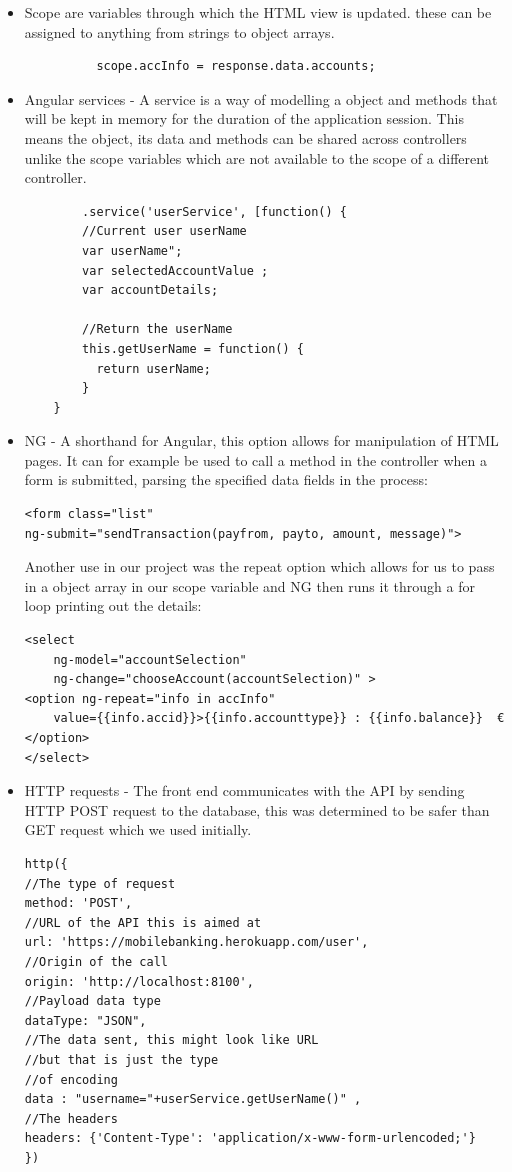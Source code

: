     \begin{itemize}
        \item Scope are variables through which the HTML view is updated. these can be assigned to anything from strings to object arrays.
\begin{verbatim}
          scope.accInfo = response.data.accounts;
\end{verbatim}

        \item Angular services - A service is a way of modelling a object and methods that will be kept in memory for the duration of the application session. This means the object, its data and methods can be shared across controllers unlike the scope variables which are not available to the scope of a different controller.

\begin{verbatim}
        .service('userService', [function() {
        //Current user userName
        var userName";
        var selectedAccountValue ;
        var accountDetails;

        //Return the userName
        this.getUserName = function() {
          return userName;
        }
    }
\end{verbatim}

        \item NG - A shorthand for Angular, this option allows for manipulation of HTML pages.
        It can for example be used to call a method in the controller when a form is submitted,
        parsing the specified data fields in the process:
\begin{verbatim}
<form class="list"
ng-submit="sendTransaction(payfrom, payto, amount, message)">
\end{verbatim}
        Another use in our project was the repeat option which allows for us to pass in a object array in our scope variable and NG then runs it through a for loop printing out the details:
\begin{verbatim}
<select
    ng-model="accountSelection"
    ng-change="chooseAccount(accountSelection)" >
<option ng-repeat="info in accInfo"
    value={{info.accid}}>{{info.accounttype}} : {{info.balance}}  €
</option>
</select>
\end{verbatim}
    \item HTTP requests - The front end communicates with the API by sending HTTP POST request to the database, this was determined to be safer than GET request which we used initially.
\begin{verbatim}
http({
//The type of request
method: 'POST',
//URL of the API this is aimed at
url: 'https://mobilebanking.herokuapp.com/user',
//Origin of the call
origin: 'http://localhost:8100',
//Payload data type
dataType: "JSON",
//The data sent, this might look like URL
//but that is just the type
//of encoding
data : "username="+userService.getUserName()" ,
//The headers
headers: {'Content-Type': 'application/x-www-form-urlencoded;'}
})
\end{verbatim}
\end{itemize}

